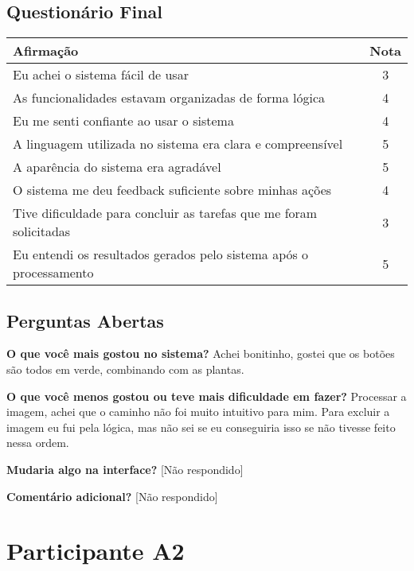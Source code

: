 \subsection*{Questionário Final}
\begin{center}
\begin{tabular}{|p{10cm}|c|}
\hline
\textbf{Afirmação} & \textbf{Nota} \\
\hline
Eu achei o sistema fácil de usar & 3 \\
As funcionalidades estavam organizadas de forma lógica & 4 \\
Eu me senti confiante ao usar o sistema & 4 \\
A linguagem utilizada no sistema era clara e compreensível & 5 \\
A aparência do sistema era agradável & 5 \\
O sistema me deu feedback suficiente sobre minhas ações & 4 \\
Tive dificuldade para concluir as tarefas que me foram solicitadas & 3 \\
Eu entendi os resultados gerados pelo sistema após o processamento & 5 \\
\hline
\end{tabular}
\end{center}

\subsection*{Perguntas Abertas}
\textbf{O que você mais gostou no sistema?} Achei bonitinho, gostei que os botões são todos em verde, combinando com as plantas.

\textbf{O que você menos gostou ou teve mais dificuldade em fazer?} Processar a imagem, achei que o caminho não foi muito intuitivo para mim. Para excluir a imagem eu fui pela lógica, mas não sei se eu conseguiria isso se não tivesse feito nessa ordem.

\textbf{Mudaria algo na interface?} [Não respondido]

\textbf{Comentário adicional?} [Não respondido]

\newpage
\section*{Participante A2}

